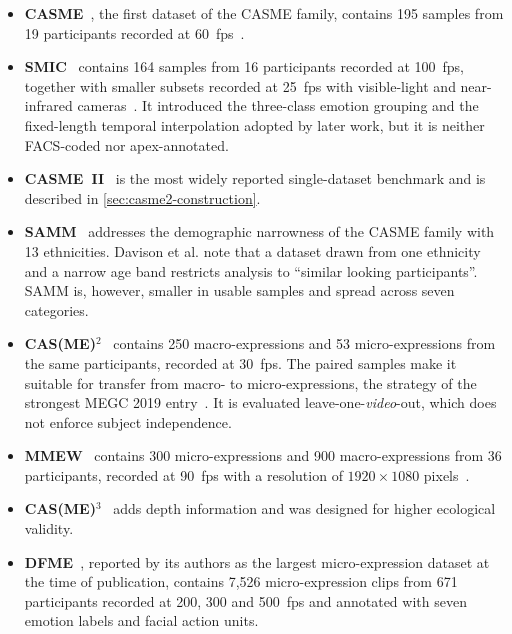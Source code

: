 \begin{itemize}
	\item \textbf{CASME}~\cite{yan2013casme}, the first dataset of the CASME family, contains 195 samples from 19 participants recorded at 60~fps~\cite{xie2022}.
	\item \textbf{SMIC}~\cite{liX2013} contains 164 samples from 16 participants recorded at 100~fps, together with smaller subsets recorded at 25~fps with visible-light and near-infrared cameras~\cite{xie2022}. It introduced the three-class emotion grouping and the fixed-length temporal interpolation adopted by later work, but it is neither FACS-coded nor apex-annotated.
	\item \textbf{CASME~II}~\cite{yan2014} is the most widely reported single-dataset benchmark and is described in \autoref{sec:casme2-construction}.
	\item \textbf{SAMM}~\cite{davison2018} addresses the demographic narrowness of the CASME family with 13 ethnicities. Davison et al. note that a dataset drawn from one ethnicity and a narrow age band restricts analysis to ``similar looking participants''. SAMM is, however, smaller in usable samples and spread across seven categories.
	\item \textbf{CAS(ME)$^2$}~\cite{qu2016} contains 250 macro-expressions and 53 micro-expressions from the same participants, recorded at 30~fps. The paired samples make it suitable for transfer from macro- to micro-expressions, the strategy of the strongest MEGC 2019 entry~\cite{liu2019,see2019}. It is evaluated leave-one-\textit{video}-out, which does not enforce subject independence.
	\item \textbf{MMEW}~\cite{ben2021} contains 300 micro-expressions and 900 macro-expressions from 36 participants, recorded at 90~fps with a resolution of $1920\times1080$ pixels~\cite{ben2021,li2022survey}.
	\item \textbf{CAS(ME)$^3$}~\cite{li2023casme3} adds depth information and was designed for higher ecological validity.
	\item \textbf{DFME}~\cite{zhao2024dfme}, reported by its authors as the largest micro-expression dataset at the time of publication, contains 7,526 micro-expression clips from 671 participants recorded at 200, 300 and 500~fps and annotated with seven emotion labels and facial action units.
\end{itemize}

